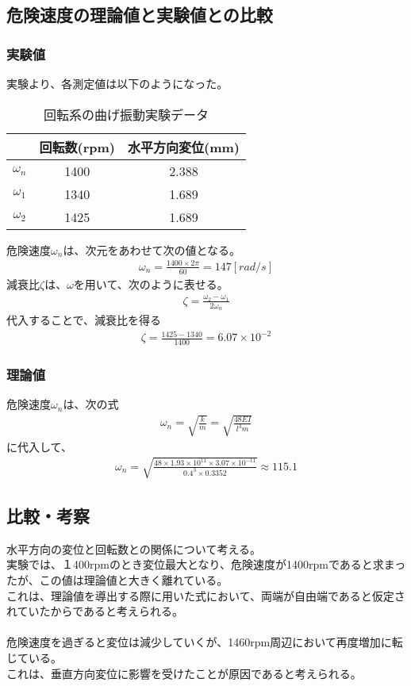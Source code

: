\documentclass{jsarticle}
\begin{document}
  \subsection{危険速度の理論値と実験値との比較}
  \subsubsection{実験値}
  実験より、各測定値は以下のようになった。

  \begin{table}[H]
   \begin{center}
    \begin{tabular}{|c||c|c|} \hline
             &回転数(rpm) &水平方向変位(mm) \\ \hline \hline
     $\omega_{n}$ &1400   &2.388  \\ \hline
     $\omega_{1}$ &1340   &1.689  \\ \hline
     $\omega_{2}$ &1425   &1.689  \\ \hline

    \end{tabular}
   \end{center}
   \caption{回転系の曲げ振動実験データ}
   \label{tbl:ltx-tbl2}
  \end{table}
  危険速度$\omega_{n}$は、次元をあわせて次の値となる。
  \begin{eqnarray}
   \omega_{n}=\frac{1400\times2\pi}{60}=147[rad/s]
  \end{eqnarray}
  減衰比$\zeta$は、$\omega$を用いて、次のように表せる。
  \begin{eqnarray}
   \zeta=\frac{\omega_{2}-\omega_{1}}{2\omega_{n}}
  \end{eqnarray}
  代入することで、減衰比を得る
  \begin{eqnarray}
   \zeta=\frac{1425-1340}{1400}=6.07\times10^{-2}
  \end{eqnarray}
  \subsubsection{理論値}
  危険速度$\omega_{n}$は、次の式
  \begin{eqnarray}
   \omega_{n}=\sqrt{\frac{k}{m}}=\sqrt{\frac{48EI}{l^{3}m}}
  \end{eqnarray}
  に代入して、
  \begin{eqnarray}
   \omega_{n}=\sqrt{\frac{48\times1.93\times10^{11}\times3.07\times10^{-11}}{0.4^{3}\times0.3352}}\approx115.1
  \end{eqnarray}
  \subsection{比較・考察}
  水平方向の変位と回転数との関係について考える。\\
  実験では、１400rpmのとき変位最大となり、危険速度が1400rpmであると求まったが、この値は理論値と大きく離れている。\\
  これは、理論値を導出する際に用いた式において、両端が自由端であると仮定されていたからであると考えられる。\\
  \\
  危険速度を過ぎると変位は減少していくが、1460rpm周辺において再度増加に転じている。\\
  これは、垂直方向変位に影響を受けたことが原因であると考えられる。
  
\end{document}
